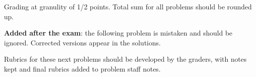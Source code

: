 \documentclass[quiz]{mcs}
\begin{document}
\renewcommand{\exampreamble}{   %
  \begin{tabular}{l}
    \textbf{Circle your}\quad   \teaminfo
  \end{tabular}

  \begin{itemize}

  \item
   This exam is \textbf{closed book} except for a 1-sided cribsheet.
   Total time is 20 minutes. 

  \item
   Write your solutions in the space provided.  If you need more
   space, write on the back of the sheet containing the problem.

\iffalse
  \item
   GOOD LUCK!
\fi

  \end{itemize}}




\begin{staffnotes}
Grading at granulity of 1/2 points.  Total sum for all problems
should be rounded up.
\end{staffnotes}


\textbf{Added after the exam}: the following problem is mistaken and
should be ignored.  Corrected versions appear in the solutions.





\examspace

\begin{staffnotes}
Rubrics for these next problems should be developed by the graders,
with notes kept and final rubrics added to problem staff notes.
\end{staffnotes}




\end{document}
